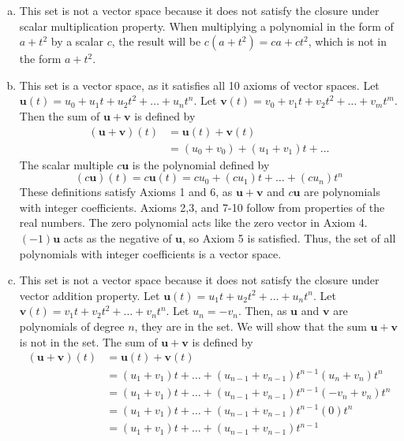 \documentclass[11pt]{scrartcl}
\theoremstyle{dotlessP}
\theoremstyle{dotlessN}
\begin{document}
\begin{enumerate}[a)]
	\item This set is not a vector space because it does not satisfy the closure under scalar multiplication property. When multiplying a polynomial in the form of $a + t^2$ by a scalar $c$, the result will be $c(a + t^2) = ca + ct^2$, which is not in the form $a + t^2$.
	\item This set is a vector space, as it satisfies all 10 axioms of vector spaces. Let $\mathbf{u}(t) = u_0 + u_1t + u_2t^2 + \dots + u_n t^n$. Let $\mathbf{v}(t) = v_0 + v_1t + v_2t^2 + \dots + v_m t^m$. Then the sum of $\mathbf{u} + \mathbf{v}$ is defined by
		\begin{align*}
			(\mathbf{u}+\mathbf{v})(t) &= \mathbf{u}(t) + \mathbf{v}(t) \\
					 &= (u_0 + v_0) + (u_1 + v_1)t + \dots 
		\end{align*}
		The scalar multiple $c\mathbf{u}$ is the polynomial defined by
		\[
		(c\mathbf{u})(t) = c\mathbf{u}(t) = cu_0 + (cu_1)t + \dots + (cu_n)t^n
		\] 
		These definitions satisfy Axioms 1 and 6, as $\mathbf{u} + \mathbf{v}$ and $c\mathbf{u}$ are polynomials with integer coefficients. Axioms 2,3, and 7-10 follow from properties of the real numbers. The zero polynomial acts like the zero vector in Axiom 4. $(-1)\mathbf{u}$ acts as the negative of $\mathbf{u}$, so Axiom 5 is satisfied. Thus, the set of all polynomials with integer coefficients is a vector space.
	\item This set is not a vector space because it does not satisfy the closure under vector addition property. Let $\mathbf{u}(t) = u_1t + u_2t^2 + \dots + u_n t^n$. Let $\mathbf{v}(t) = v_1t + v_2t^2 + \dots + v_n t^n$. Let $u_n = -v_n$. Then, as  $\mathbf{u}$ and $\mathbf{v}$ are polynomials of degree $n$, they are in the set. We will show that the sum $\mathbf{u} + \mathbf{v}$ is not in the set. The sum of $\mathbf{u} + \mathbf{v}$ is defined by
		\begin{align*}
			(\mathbf{u}+\mathbf{v})(t) &= \mathbf{u}(t) + \mathbf{v}(t) \\
									   &= (u_1 + v_1)t + \dots + (u_{n-1} + v_{n-1})t^{n-1} (u_n + v_n)t^n \\
									   &= (u_1 + v_1)t + \dots + (u_{n-1} + v_{n-1})t^{n-1} (- v_n + v_n)t^n \\
									   &= (u_1 + v_1)t + \dots + (u_{n-1} + v_{n-1})t^{n-1} (0)t^n \\
									   &=  (u_1 + v_1)t + \dots + (u_{n-1} + v_{n-1})t^{n-1}
		\end{align*}

\end{enumerate}
\end{document}

